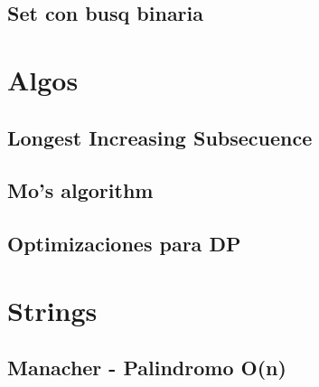 \subsection{Set con busq binaria} %



\section{Algos}%
\subsection{Longest Increasing Subsecuence}
\subsection{Mo's algorithm}
\subsection{Optimizaciones para DP} %

\section{Strings}%
\subsection{Manacher - Palindromo O(n)}
